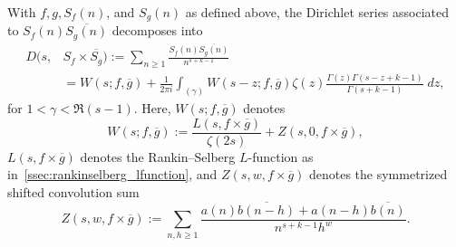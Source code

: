 \begin{proposition}\label{prop:SfSg_decomposition}
  With $f, g, S_f(n)$, and $S_g(n)$ as defined above, the Dirichlet series associated to
  $S_f(n)\overline{S_g(n)}$ decomposes into
  \begin{equation}
    \begin{split}
      D(s, &S_f \times \overline{S_g}) := \sum_{n \geq 1} \frac{S_f(n)
      \overline{S_g(n)}}{n^{s + k - 1}} \\
      &= W(s; f,\overline{g}) + \frac{1}{2\pi i} \int_{(\gamma)} W(s - z; f,\overline{g})
      \zeta(z) \frac{\Gamma(z) \Gamma(s - z + k - 1)}{\Gamma(s + k - 1)} \; dz,
    \end{split}
  \end{equation}
  for $1 < \gamma < \Re(s-1)$.
  Here, $W(s; f, \overline{g})$ denotes
  \begin{equation}
    W(s; f,\overline{g}) := \frac{L(s, f\times \overline{g})}{\zeta(2s)} + Z(s, 0, f\times
    \overline{g}),
  \end{equation}
  $L(s, f\times \overline{g})$ denotes the Rankin--Selberg $L$-function %
  as in~\ref{ssec:rankinselberg_lfunction},
  and $Z(s, w, f\times \overline{g})$ denotes the symmetrized
  shifted convolution sum
  \begin{equation}
    Z(s,w,f\times \overline{g}) := \sum_{n,h \geq 1} \frac{a(n)\overline{b(n-h)} +
    a(n-h)\overline{b(n)}}{n^{s + k - 1} h^w}.
  \end{equation}
\end{proposition}


